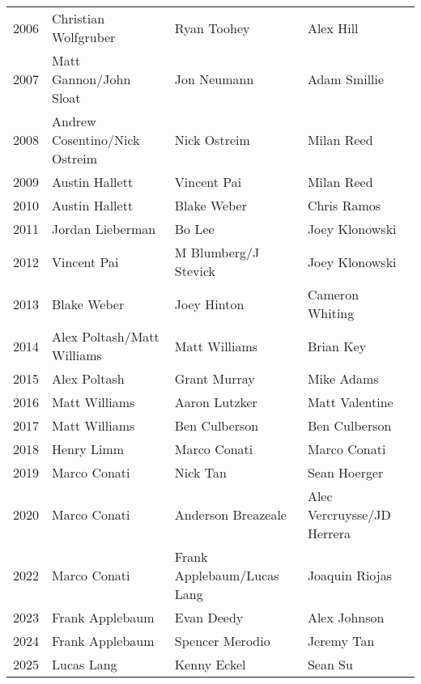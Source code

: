 \begin{table}[H]
{\begin{tabular}{clll}
2006 & Christian Wolfgruber & Ryan Toohey & Alex Hill \\
2007 & Matt Gannon/John Sloat & Jon Neumann & Adam Smillie \\
2008 & Andrew Cosentino/Nick Ostreim & Nick Ostreim & Milan Reed \\
2009 & Austin Hallett & Vincent Pai & Milan Reed \\
2010 & Austin Hallett & Blake Weber & Chris Ramos \\
2011 & Jordan Lieberman & Bo Lee & Joey Klonowski \\
2012 & Vincent Pai & M Blumberg/J Stevick & Joey Klonowski \\
2013 & Blake Weber & Joey Hinton & Cameron Whiting \\
2014 & Alex Poltash/Matt Williams & Matt Williams & Brian Key \\
2015 & Alex Poltash & Grant Murray & Mike Adams \\
2016 & Matt Williams & Aaron Lutzker & Matt Valentine \\
2017 & Matt Williams & Ben Culberson & Ben Culberson \\
2018 & Henry Limm & Marco Conati & Marco Conati \\
2019 & Marco Conati & Nick Tan & Sean Hoerger \\
2020 & Marco Conati & Anderson Breazeale & Alec Vercruysse/JD Herrera \\
2022 & Marco Conati & Frank Applebaum/Lucas Lang & Joaquin Riojas \\
2023 & Frank Applebaum & Evan Deedy & Alex Johnson \\
2024 & Frank Applebaum & Spencer Merodio & Jeremy Tan \\
2025 & Lucas Lang & Kenny Eckel & Sean Su \\
\bottomrule
\end{tabular}%
}
\end{table}


